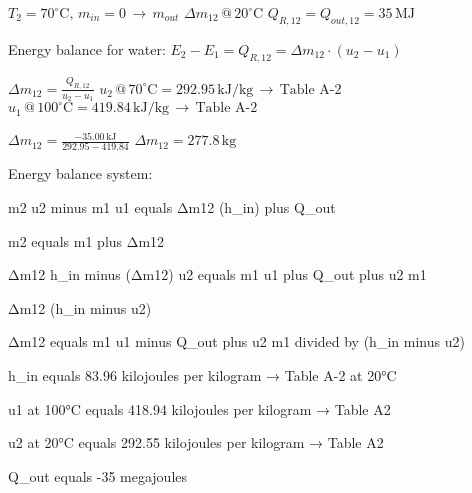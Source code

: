 \( T_2 = 70^\circ \text{C}, \, m_{in} = 0 \, \rightarrow \, m_{out} \)  
\( \Delta m_{12} \, @ \, 20^\circ \text{C} \)  
\( Q_{R,12} = Q_{out,12} = 35 \, \text{MJ} \)  

Energy balance for water:  
\( E_2 - E_1 = Q_{R,12} = \Delta m_{12} \cdot (u_2 - u_1) \)  

\( \Delta m_{12} = \frac{Q_{R,12}}{u_2 - u_1} \)  
\( u_2 \, @ \, 70^\circ \text{C} = 292.95 \, \text{kJ/kg} \, \rightarrow \, \text{Table A-2} \)  
\( u_1 \, @ \, 100^\circ \text{C} = 419.84 \, \text{kJ/kg} \, \rightarrow \, \text{Table A-2} \)  

\( \Delta m_{12} = \frac{-35.00 \, \text{kJ}}{292.95 - 419.84} \)  
\( \Delta m_{12} = 277.8 \, \text{kg} \)

Energy balance system:  

m2 u2 minus m1 u1 equals Δm12 (h_in) plus Q_out  

m2 equals m1 plus Δm12  

Δm12 h_in minus (Δm12) u2 equals m1 u1 plus Q_out plus u2 m1  

Δm12 (h_in minus u2)  

Δm12 equals m1 u1 minus Q_out plus u2 m1 divided by (h_in minus u2)  

h_in equals 83.96 kilojoules per kilogram → Table A-2 at 20°C  

u1 at 100°C equals 418.94 kilojoules per kilogram → Table A2  

u2 at 20°C equals 292.55 kilojoules per kilogram → Table A2  

Q_out equals -35 megajoules